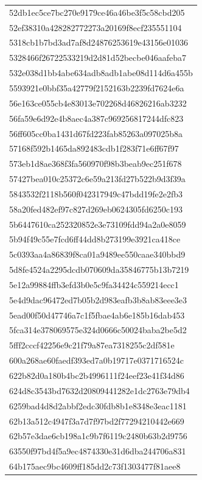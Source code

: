 \begin{tabular}{l}
52db1ec5ce7bc270e9179ce46a46be3f5c58cbd205 \\
52ef38310a428282772273a20169f8ecf235551104 \\
5318cb1b7bd3ad7af8d24876253619e43156e01036 \\
5328466f26722533219d2d81d52becbe046aafeba7 \\
532e038d1bb4abe634adb8adb1abe08d114d6a455b \\
5593921e0bbf35a42779f2152163b2239fd7624e6a \\
56e163ce055cb4e83013e702268d46826216ab3232 \\
56fa59e6d92e4b8aec4a387c969256817244dfc823 \\
56ff605cc0ba1431d67fd223fab85263a097025b8a \\
57168f592b1465da892483cdb1f283f71e6ff67f97 \\
573eb1d8ae368f3fa560970f98b3beab9ec251f678 \\
57427bea010c25372c6e59a213fd27b522b9d3f39a \\
5843532f2118b560f042317949c47bdd19fe2e2fb3 \\
58a20fed482ef97c827d269eb0624305fd6250c193 \\
5b6447610ca252320852e3e73109fdd94a2a0e8059 \\
5b94f49c55e7fcd6ff44dd8b273199e3921ca418ce \\
5c0393aa4a86839f8ca01a9489ee550caae340bbd9 \\
5d8fe4524a2295dcdb070609da35846775b13b7219 \\
5e12a99884ffb3efd3b0e5c9fa34424c559214ecc1 \\
5e4d9dac96472ed7b05b2d983eafb3b8ab83eee3e3 \\
5ead00f50d47746a7c1f5fbae4ab6e185b16dab453 \\
5fca314e378069575e324d0666c50024baba2be5d2 \\
5fff2cccf42256e9c21f79a87ea7318255c2df581e \\
600a268ae60faedf393ed7a0b19717e0371716524c \\
622b82d0a180b4bc2b4996111f24eef23e41f34d86 \\
624d8c3543bd7632d20809441282e1dc2763e79db4 \\
6259bad4d8d2abbf2edc30fdb8b1e8348e3eac1181 \\
62b13a512c4947f3a7d7f97bd2f77294210442e669 \\
62b57e3dae6cb198a1c9b7f6119c2480b63b2d9756 \\
63550f97bd4f5a9ec4874330e31d6dba244706a831 \\
64b175aec9bc4609ff185dd2c73f1303477f81aee8 \\

\end{tabular}
